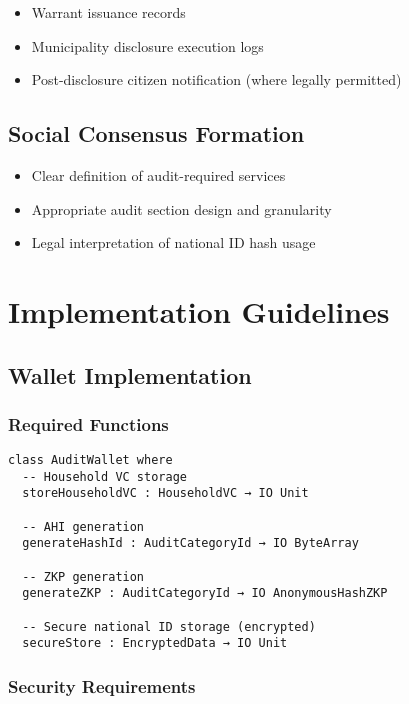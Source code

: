 \begin{itemize}
  \item Warrant issuance records
  \item Municipality disclosure execution logs
  \item Post-disclosure citizen notification (where legally permitted)
\end{itemize}

\subsection{Social Consensus Formation}

\begin{itemize}
  \item Clear definition of audit-required services
  \item Appropriate audit section design and granularity
  \item Legal interpretation of national ID hash usage
\end{itemize}

\section{Implementation Guidelines}

\subsection{Wallet Implementation}

\subsubsection{Required Functions}

\begin{lstlisting}[language=Lean]
class AuditWallet where
  -- Household VC storage
  storeHouseholdVC : HouseholdVC → IO Unit

  -- AHI generation
  generateHashId : AuditCategoryId → IO ByteArray

  -- ZKP generation
  generateZKP : AuditCategoryId → IO AnonymousHashZKP

  -- Secure national ID storage (encrypted)
  secureStore : EncryptedData → IO Unit
\end{lstlisting}

\subsubsection{Security Requirements}


